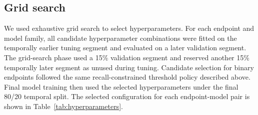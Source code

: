 \documentclass[11pt,a4paper]{article}
\begin{document}
\subsection{Grid search}

We used exhaustive grid search to select hyperparameters. For each endpoint and model family, all candidate hyperparameter combinations were fitted on the temporally earlier tuning segment and evaluated on a later validation segment. The grid-search phase used a 15\% validation segment and reserved another 15\% temporally later segment as unused during tuning. Candidate selection for binary endpoints followed the same recall-constrained threshold policy described above. Final model training then used the selected hyperparameters under the final 80/20 temporal split. The selected configuration for each endpoint-model pair is shown in Table~\ref{tab:hyperparameters}.
\end{document}

